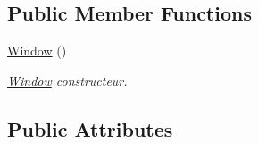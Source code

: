 \subsection*{Public Member Functions}
\begin{DoxyCompactItemize}
\item 
\hyperlink{class_window_a74e6087da23d3c24e9fac0245e5ec92c}{Window} ()\hypertarget{class_window_a74e6087da23d3c24e9fac0245e5ec92c}{}\label{class_window_a74e6087da23d3c24e9fac0245e5ec92c}

\begin{DoxyCompactList}\small\item\em \hyperlink{class_window}{Window} constructeur. \end{DoxyCompactList}\end{DoxyCompactItemize}
\subsection*{Public Attributes}
